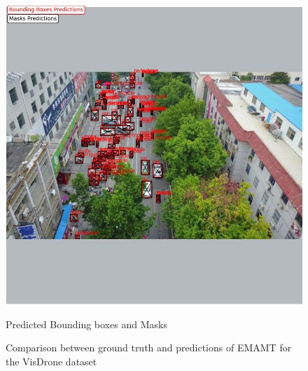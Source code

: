 \begin{figure}[!h]
\begin{minipage}{0.4\textwidth}
      \includegraphics[scale=0.35]{Figures/vis_predictions.jpg}
      \caption{Predicted Bounding boxes and Masks}
    \end{minipage}
    \caption{Comparison between ground truth and predictions of EMAMT for the VisDrone dataset}
    \label{fig:vis-images}
\end{figure}


